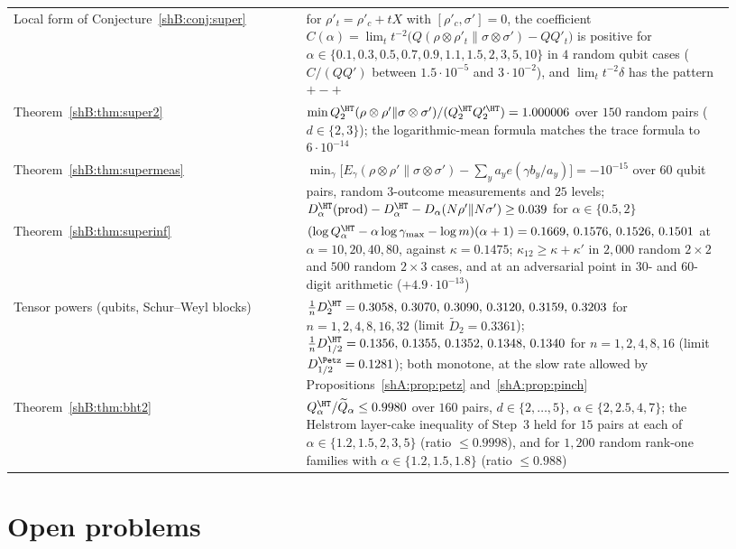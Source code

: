 {\begin{longtable}{>{\raggedright\arraybackslash}p{0.38\linewidth}>{\raggedright\arraybackslash}p{0.55\linewidth}}
Local form of Conjecture~\ref{shB:conj:super} & for $\rho'_t=\rho'_c+tX$ with $[\rho'_c,\sigma']=0$, the coefficient $C(\alpha)=\lim_t t^{-2}\big(Q(\rho\otimes\rho'_t\|\sigma\otimes\sigma')-QQ'_t\big)$ is positive for $\alpha\in\{0.1,0.3,0.5,0.7,0.9,1.1,1.5,2,3,5,10\}$ in $4$ random qubit cases ($C/(QQ')$ between $1.5\cdot10^{-5}$ and $3\cdot10^{-2}$), and $\lim_t t^{-2}\delta$ has the pattern $+-+$\\
Theorem~\ref{shB:thm:super2} & $\min Q^\HT_2(\rho\otimes\rho'\|\sigma\otimes\sigma')/(Q^\HT_2Q'^\HT_2)=1.000006$ over $150$ random pairs ($d\in\{2,3\}$); the logarithmic-mean formula matches the trace formula to $6\cdot10^{-14}$\\
Theorem~\ref{shB:thm:supermeas} & $\min_\gamma\big[E_\gamma(\rho\otimes\rho'\|\sigma\otimes\sigma')-\sum_ya_ye(\gamma b_y/a_y)\big]=-10^{-15}$ over $60$ qubit pairs, random $3$-outcome measurements and $25$ levels; $D^\HT_\alpha(\text{prod})-D^\HT_\alpha-D_\alpha(N\rho'\|N\sigma')\ge0.039$ for $\alpha\in\{0.5,2\}$\\
Theorem~\ref{shB:thm:superinf} & $(\log Q^\HT_\alpha-\alpha\log\gamma_{\max}-\log m)(\alpha+1)=0.1669,\,0.1576,\,0.1526,\,0.1501$ at $\alpha=10,20,40,80$, against $\kappa=0.1475$; $\kappa_{12}\ge\kappa+\kappa'$ in $2{,}000$ random $2\times2$ and $500$ random $2\times3$ cases, and at an adversarial point in $30$- and $60$-digit arithmetic ($+4.9\cdot10^{-13}$)\\
Tensor powers (qubits, Schur--Weyl blocks) & $\frac1nD^\HT_2=0.3058,\,0.3070,\,0.3090,\,0.3120,\,0.3159,\,0.3203$ for $n=1,2,4,8,16,32$ (limit $\widetilde D_2=0.3361$); $\frac1nD^\HT_{1/2}=0.1356,\,0.1355,\,0.1352,\,0.1348,\,0.1340$ for $n=1,2,4,8,16$ (limit $D^\Petz_{1/2}=0.1281$); both monotone, at the slow rate allowed by Propositions~\ref{shA:prop:petz} and~\ref{shA:prop:pinch}\\
Theorem~\ref{shB:thm:bht2} & $Q^\HT_\alpha/\widetilde Q_\alpha\le0.9980$ over $160$ pairs, $d\in\{2,\dots,5\}$, $\alpha\in\{2,2.5,4,7\}$; the Helstrom layer-cake inequality of Step~3 held for $15$ pairs at each of $\alpha\in\{1.2,1.5,2,3,5\}$ (ratio $\le0.9998$), and for $1{,}200$ random rank-one families with $\alpha\in\{1.2,1.5,1.8\}$ (ratio $\le0.988$)\\
\bottomrule
\end{longtable}
}

\section{Open problems}\label{shB:sec:open}

